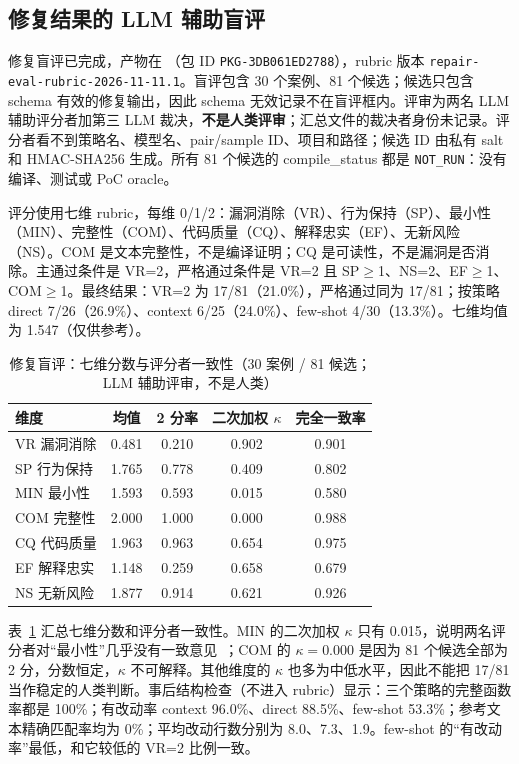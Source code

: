 \documentclass[conference]{IEEEtran}
\begin{document}
\subsection{修复结果的 LLM 辅助盲评}
\label{sec:human-review}
修复盲评已完成，产物在 （包 ID \texttt{PKG-3DB061ED2788}），rubric 版本 \texttt{repair-eval-rubric-2026-11-11.1}。盲评包含 30 个案例、81 个候选；候选只包含 schema 有效的修复输出，因此 schema 无效记录不在盲评框内。评审为两名 LLM 辅助评分者加第三 LLM 裁决，\textbf{不是人类评审}；汇总文件的裁决者身份未记录。评分者看不到策略名、模型名、pair/sample ID、项目和路径；候选 ID 由私有 salt 和 HMAC-SHA256 生成。所有 81 个候选的 compile\_status 都是 \texttt{NOT\_RUN}：没有编译、测试或 PoC oracle。

评分使用七维 rubric，每维 0/1/2：漏洞消除（VR）、行为保持（SP）、最小性（MIN）、完整性（COM）、代码质量（CQ）、解释忠实（EF）、无新风险（NS）。COM 是文本完整性，不是编译证明；CQ 是可读性，不是漏洞是否消除。主通过条件是 VR=2，严格通过条件是 VR=2 且 SP$\ge$1、NS=2、EF$\ge$1、COM$\ge$1。最终结果：VR=2 为 17/81（21.0\%），严格通过同为 17/81；按策略 direct 7/26（26.9\%）、context 6/25（24.0\%）、few-shot 4/30（13.3\%）。七维均值为 1.547（仅供参考）。

\begin{table}[t]
\caption{修复盲评：七维分数与评分者一致性（30 案例 / 81 候选；LLM 辅助评审，不是人类）}
\label{tab:blind}
\centering
\small
\begin{tabular}{@{}lcccc@{}}
\toprule
维度 & 均值 & 2 分率 & 二次加权 $\kappa$ & 完全一致率\\
\midrule
VR 漏洞消除 & 0.481 & 0.210 & 0.902 & 0.901\\
SP 行为保持 & 1.765 & 0.778 & 0.409 & 0.802\\
MIN 最小性 & 1.593 & 0.593 & 0.015 & 0.580\\
COM 完整性 & 2.000 & 1.000 & 0.000 & 0.988\\
CQ 代码质量 & 1.963 & 0.963 & 0.654 & 0.975\\
EF 解释忠实 & 1.148 & 0.259 & 0.658 & 0.679\\
NS 无新风险 & 1.877 & 0.914 & 0.621 & 0.926\\
\bottomrule
\end{tabular}
\end{table}

表~\ref{tab:blind} 汇总七维分数和评分者一致性。MIN 的二次加权 $\kappa$ 只有 0.015，说明两名评分者对“最小性”几乎没有一致意见~\cite{landis1977}；COM 的 $\kappa=0.000$ 是因为 81 个候选全部为 2 分，分数恒定，$\kappa$ 不可解释。其他维度的 $\kappa$ 也多为中低水平，因此不能把 17/81 当作稳定的人类判断。事后结构检查（不进入 rubric）显示：三个策略的完整函数率都是 100\%；有改动率 context 96.0\%、direct 88.5\%、few-shot 53.3\%；参考文本精确匹配率均为 0\%；平均改动行数分别为 8.0、7.3、1.9。few-shot 的“有改动率”最低，和它较低的 VR=2 比例一致。
\end{document}
